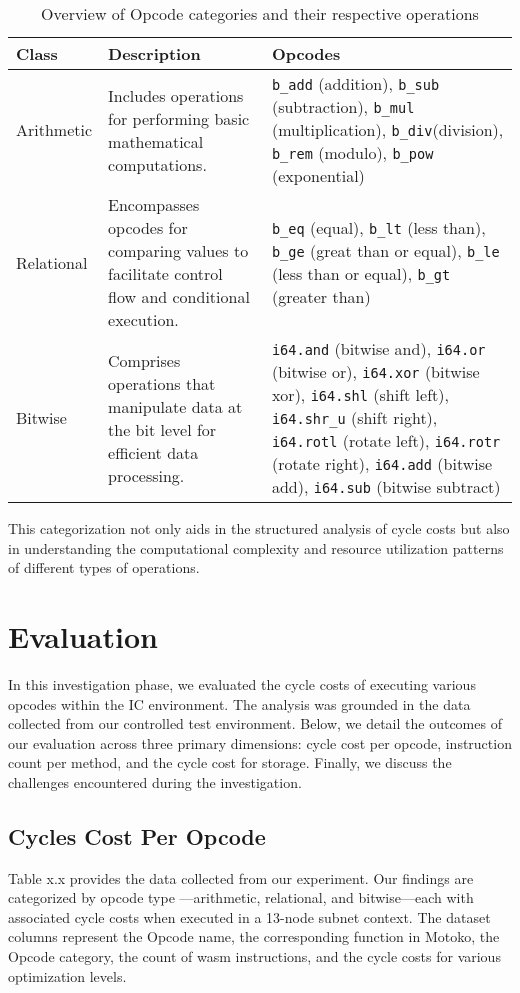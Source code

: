 \begin{table}[h]
\centering
\begin{tabular}{|l|p{}|p{}|}
\hline
\textbf{Class} & \textbf{Description} & \textbf{Opcodes} \\
\hline
Arithmetic & Includes operations for performing basic mathematical computations. & \texttt{b\_add} (addition), \texttt{b\_sub} (subtraction), \texttt{b\_mul} (multiplication), \texttt{b\_div}(division), \texttt{b\_rem} (modulo), \texttt{b\_pow} (exponential) \\
\hline
Relational & Encompasses opcodes for comparing values to facilitate control flow and conditional execution. & \texttt{b\_eq} (equal), \texttt{b\_lt} (less than), \texttt{b\_ge} (great than or equal), \texttt{b\_le} (less than or equal), \texttt{b\_gt} (greater than) \\
\hline
Bitwise & Comprises operations that manipulate data at the bit level for efficient data processing. & \texttt{i64.and} (bitwise and), \texttt{i64.or} (bitwise or), \texttt{i64.xor} (bitwise xor), \texttt{i64.shl} (shift left), \texttt{i64.shr\_u} (shift right), \texttt{i64.rotl} (rotate left), \texttt{i64.rotr} (rotate right), \texttt{i64.add} (bitwise add), \texttt{i64.sub} (bitwise subtract) \\
\hline
\end{tabular}
\caption{Overview of Opcode categories and their respective operations}
\label{tab:opcodeCategories}
\end{table}

This categorization not only aids in the structured analysis of cycle costs but also in understanding the computational complexity and resource utilization patterns of different types of operations.




\section{Evaluation}
\label{sec:Evaluation}
In this investigation phase, we evaluated the cycle costs of executing various opcodes within the  IC environment. The analysis was grounded in the data collected from our controlled test environment. Below, we detail the outcomes of our evaluation across three primary dimensions: cycle cost per opcode, instruction count per method, and the cycle cost for storage. Finally, we discuss the challenges encountered during the investigation.

\subsection{Cycles Cost Per Opcode }
Table x.x provides the data collected from our experiment. Our findings are categorized by opcode type —arithmetic, relational, and bitwise—each with associated cycle costs when executed in a 13-node subnet context. The dataset columns represent the Opcode name, the corresponding function in Motoko, the Opcode category, the count of wasm instructions, and the cycle costs for various optimization levels.

